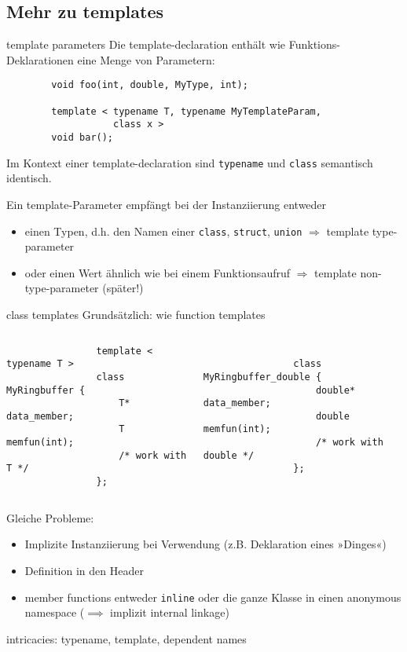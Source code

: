 \subsection{Mehr zu templates}

\begin{frame}[fragile]{template parameters}
	Die template-declaration enthält wie Funktions-Deklarationen eine Menge von Parametern:
	\begin{lstlisting}
		void foo(int, double, MyType, int);
		
		template < typename T, typename MyTemplateParam,
		           class x >
		void bar();
	\end{lstlisting}
	
	Im Kontext einer template-declaration sind \verb|typename| und \verb|class| semantisch identisch.
	
	\pause
	
	Ein template-Parameter empfängt bei der Instanziierung entweder
	\begin{itemize}
		\item einen Typen, d.h. den Namen einer \verb|class|, \verb|struct|, \verb|union| $\Rightarrow$ template type-parameter
		\item oder einen Wert ähnlich wie bei einem Funktionsaufruf $\Rightarrow$ template non-type-parameter \alert{(später!)}
	\end{itemize}
\end{frame}

\begin{frame}[fragile]{class templates}
	Grundsätzlich: wie function templates
	
	\begin{columns}
			\begin{lstlisting}
				template < typename T >
				class MyRingbuffer {
				    T* data_member;
				    T memfun(int);
				    /* work with T */
				};
			\end{lstlisting}
			
			\begin{lstlisting}
				
				class MyRingbuffer_double {
				    double* data_member;
				    double memfun(int);
				    /* work with double */
				};
			\end{lstlisting}
	\end{columns}
	
	\pause
	\vspace{1em}
	
	Gleiche Probleme:
	\begin{itemize}
		\item Implizite Instanziierung bei Verwendung (z.B. Deklaration eines »Dinges«)
		\item Definition in den Header
		\item member functions entweder \verb|inline| oder die ganze Klasse in einen anonymous namespace ($\implies$ implizit internal linkage)
	\end{itemize}
\end{frame}

\begin{frame}{intricacies: typename, template, dependent names}
\end{frame}
